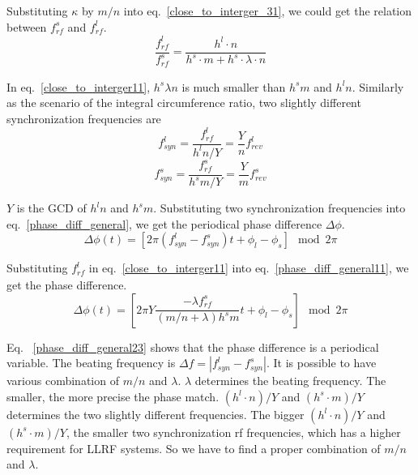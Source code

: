 Substituting $\kappa$ by $m/n$ into eq.~\ref{close_to_interger_31}, we could get the relation between $f_{\mathit{rf}}^{s}$ and $f_{\mathit{rf}}^{l}$.
\begin{equation} 
\frac{f_{\mathit{rf}}^{l}}{f_{\mathit{rf}}^{s}}=\frac{h^l\cdot n}{h^s \cdot m+ h^s \cdot\lambda\cdot n}\label{close_to_interger11}
\end{equation}

In eq.~\ref{close_to_interger11}, $h^s\lambda n $ is much smaller than $h^s m$ and $h^l n$. Similarly as the scenario of the integral circumference ratio, two slightly different synchronization frequencies are 
\begin{equation}
f_{\mathit{syn}}^{l}=\frac{f_{\mathit{rf}}^{l}}{h^{l}n/Y}=\frac{Y}{n}f_{\mathit{rev}}^{l} \label{synch_freq111}
\end{equation}
\begin{equation}
f_{\mathit{syn}}^{s}=\frac{f_{\mathit{rf}}^{s}}{h^{s}m/Y}=\frac{Y}{m}f_{\mathit{rev}}^{s} \label{synch_freq222}
\end{equation}

$Y$ is the GCD of $h^l n$ and $h^s m$. Substituting two synchronization frequencies into eq.~\ref{phase_diff_general}, we get the periodical phase difference $\Delta \phi$.
\begin{equation}
	\Delta \phi(t)=[2\pi(f_{\mathit{syn}}^{l}-f_{\mathit{syn}}^{s})t+\phi_l-\phi_s] \mod 2\pi \label{phase_diff_general11}
\end{equation}

Substituting $f_{\mathit{rf}}^{l}$ in eq.~\ref{close_to_interger11} into eq.~\ref{phase_diff_general11}, we get the phase difference.
\begin{equation}
	\Delta \phi(t)=[2\pi Y\frac{-\lambda f_{\mathit{rf}}^{s}}{(m/n+\lambda)h^{s}m}t+\phi_l-\phi_s] \mod 2\pi \label{phase_diff_general23}
\end{equation}

Eq. ~\ref{phase_diff_general23} shows that the phase difference is a periodical variable. The beating frequency is $\Delta f=|f_{\mathit{syn}}^{l}-f_{\mathit{syn}}^{s}|$. It is possible to have various combination of $m/n$ and $\lambda$. $\lambda$ determines the beating frequency. The smaller, the more precise the phase match. $(h^l\cdot n)/Y$ and $(h^s\cdot m)/Y$ determines the two slightly different frequencies. The bigger $(h^l\cdot n)/Y$ and $(h^s\cdot m)/Y$, the smaller two synchronization rf frequencies, which has a higher requirement for LLRF systems. So we have to find a proper combination of $m/n$ and $\lambda$. 

